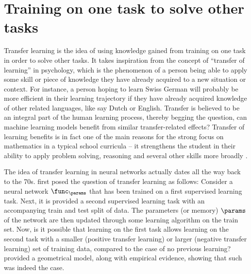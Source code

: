 \section{Training on one task to solve other tasks}


Transfer learning is the idea of using knowledge gained from training on one task in order to solve other tasks. It takes inspiration from the concept of ``transfer of learning'' in psychology,
which is the phenomenon of a person being able to apply some skill or piece of knowledge they have already acquired to a new situation or context. For instance, a person hoping to learn Swiss German will probably be more efficient in their learning trajectory if they have already acquired knowledge of other related languages, like say Dutch or English. Transfer is believed to be an integral part of the human learning process,
thereby begging the question, can machine learning models benefit from similar transfer-related effects?
Transfer of learning benefits is in fact one of the main reasons for the strong focus on mathematics in a typical school curricula -- it strengthens the student in their ability to apply problem solving, reasoning and several other skills more broadly \citep{hohensee2021transfer}.
 
The idea of transfer learning in neural networks actually dates all the way back to the 70s.
\citet{bozinovski1976influence} first posed the question of transfer learning as follows: Consider a neural network $\func_\params$ that has been trained on a first supervised learning task. Next, it is provided a second supervised learning task with an accompanying train and test split of data. The parameters (or memory) $\params$ of the network are then updated through some learning algorithm on the train set. Now, is it possible that learning on the first task allows learning on the second task with a smaller (positive transfer learning) or larger (negative transfer learning) set of training data, compared to the case of no previous learning? \citet{bozinovski1976influence} provided a geometrical model, along with empirical evidence, showing that such was indeed the case.

